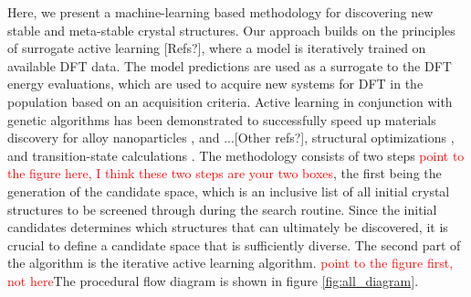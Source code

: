 

Here, we present a machine-learning based methodology for discovering new stable and meta-stable crystal structures.
%
Our approach builds on the principles of surrogate active learning [Refs?],
where a model is iteratively trained on available DFT data.
%
The model predictions are used as a surrogate to the DFT energy evaluations,
which are used to acquire new systems for DFT in the population based on an acquisition criteria.
Active learning in conjunction with genetic algorithms has been demonstrated to successfully speed up materials discovery for alloy nanoparticles \cite{Jennings2019}, and ...[Other refs?],  structural optimizations \cite{hansen2019atomistic}, and transition-state calculations \cite{torres2019low}.
The methodology consists of two steps \textcolor{red}{point to the figure here, I think these two steps are your two boxes}, the first being the generation of the candidate space,
which is an inclusive list of all initial crystal structures to be screened through during the search routine.
%
Since the initial candidates determines which structures that can ultimately be discovered, it is crucial to define a candidate space that is sufficiently diverse.
The second part of the algorithm is the iterative active learning algorithm.
\textcolor{red}{point to the figure first, not here}The procedural flow diagram is shown in figure \ref{fig:all_diagram}.

